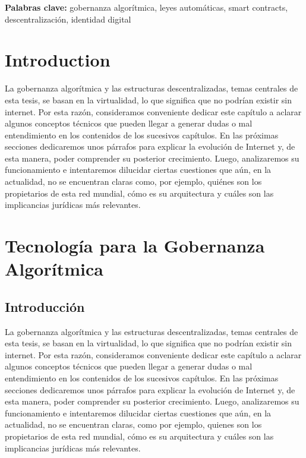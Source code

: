 \documentclass[12pt]{report} %
\begin{document}
\textbf{Palabras clave:} gobernanza algorítmica, leyes automáticas, smart contracts, descentralización, identidad digital



\chapter{Introduction}
\label{Introducción}
La gobernanza algorítmica y las estructuras descentralizadas, temas centrales de esta tesis, se basan en la virtualidad, lo que significa que no podrían existir sin internet. Por esta razón, consideramos conveniente dedicar este capítulo a aclarar algunos conceptos técnicos que pueden llegar a generar dudas o mal entendimiento en los contenidos de los sucesivos capítulos. En las próximas secciones dedicaremos unos párrafos para explicar la evolución de Internet y, de esta manera, poder comprender su posterior crecimiento. Luego, analizaremos su funcionamiento e intentaremos dilucidar ciertas cuestiones que aún, en la actualidad, no se encuentran claras como, por ejemplo, quiénes son los propietarios de esta red mundial, cómo es su arquitectura y cuáles son las implicancias jurídicas más relevantes.





\chapter{Tecnología para la Gobernanza Algorítmica}
\label{Tecnología para la Gobernanza Algorítmica}
\section{Introducción}
La gobernanza algorítmica y las estructuras descentralizadas, temas centrales de esta tesis, se basan en la virtualidad, lo que significa que no podrían existir sin internet. Por esta razón, consideramos conveniente dedicar este capítulo a aclarar algunos conceptos técnicos que pueden llegar a generar dudas o mal entendimiento en los contenidos de los sucesivos capítulos. En las próximas secciones dedicaremos unos párrafos para explicar la evolución de Internet y, de esta manera, poder comprender su posterior crecimiento. Luego, analizaremos su funcionamiento e intentaremos dilucidar ciertas cuestiones que aún, en la actualidad, no se encuentran claras, como por ejemplo, quienes son los propietarios de esta red mundial, cómo es su arquitectura y cuáles son las implicancias jurídicas más relevantes.
\end{document}
